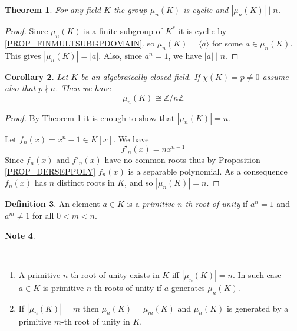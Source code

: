 \documentclass[12pt, letterpaper, oneside]{article}
\theoremstyle{plain}
\newtheorem{theorem}{Theorem}[section]
\newtheorem{corollary}[theorem]{Corollary}
\theoremstyle{definition}
\newtheorem{definition}[theorem]{Definition}
\newtheorem{note}[theorem]{Note}
\newcommand{\Z}{{\mathbb Z}}
\newcommand{\subgp}[1]{\langle#1\rangle}
\newcommand{\benu}{\begin{enumerate}}
\newcommand{\eenu}{\end{enumerate}}
\newcommand{\vs}{\vskip 5mm}
\newcommand{\isep}[1][0]{\setlength{\itemsep}{#1 mm}}
\begin{document}
\begin{theorem}
\label{THM_ROOTSOFUNITYCYCLIC}
For any field $K$ the group $\mu_{n}(K)$ is cyclic and $|\mu_{n}(K)| \mid n$. 
\end{theorem}

\vs

\begin{proof}

Since $\mu_{n}(K)$ is a finite subgroup of $K^{\ast}$ it is cyclic by \ref{PROP_FINMULTSUBGPDOMAIN}. 
so  $\mu_{n}(K) = \subgp{a}$ for some $a\in \mu_{n}(K)$. This gives $|\mu_{n}(K)| = |a|$. Also, since $a^{n} =1$, we have  $|a| \mid n$. 

\end{proof}

\vs\vs


\begin{corollary}
Let $K$ be an algebraically closed field.  If $\chi(K) = p\neq 0$ assume also that $p\nmid n$. 
Then we have 
$$\mu_{n}(K) \cong \Z/n\Z$$
\end{corollary}

\vs

\begin{proof}
By Theorem \ref{THM_ROOTSOFUNITYCYCLIC} it is enough to show that 
$|\mu_{n}(K)| = n$. 

Let $f_{n}(x) = x^{n}-1\in K[x]$. We have 
$$f'_{n}(x) = nx^{n-1} $$
Since  $f_{n}(x)$ and $f'_{n}(x)$ have no common roots thus by Proposition \ref{PROP_DERSEPPOLY}
$f_{n}(x)$ is a separable polynomial. As a consequence $f_{n}(x)$ has $n$ distinct roots in 
$K$, and so $|\mu_{n}(K)| = n$. 
\end{proof}


\vs\vs

\begin{definition}
An element $a\in K$ is a \emph{primitive $n$-th root of unity} if $a^{n}=1$ and $a^{m}\neq 1$
for all $0 < m < n$. 
\end{definition}

\vs\vs

\begin{note}\ 

\vskip -13mm

\ 
\benu
\isep[5]
\item A primitive $n$-th root of unity exists in $K$ iff $|\mu_{n}(K)| = n$. In such case 
$a\in K$ is primitive $n$-th roots of unity if $a$ generates $\mu_{n}(K)$. 

\item If $|\mu_{n}(K)| = m$ then $\mu_{n}(K) = \mu_{m}(K)$ and $\mu_{n}(K)$ is generated 
by a primitive $m$-th root of unity in $K$. 
\eenu

\end{note}
\end{document}
